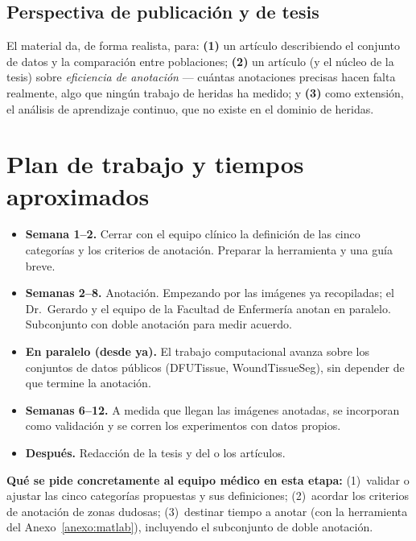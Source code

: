 \documentclass[12pt,letterpaper]{article}
\begin{document}
\subsection{Perspectiva de publicación y de tesis}

El material da, de forma realista, para: \textbf{(1)} un artículo describiendo el conjunto de datos y
la comparación entre poblaciones; \textbf{(2)} un artículo (y el núcleo de la tesis) sobre
\emph{eficiencia de anotación} --- cuántas anotaciones precisas hacen falta realmente, algo que
ningún trabajo de heridas ha medido; y \textbf{(3)} como extensión, el análisis de aprendizaje
continuo, que no existe en el dominio de heridas.

\section{Plan de trabajo y tiempos aproximados}

\begin{itemize}
  \item \textbf{Semana 1--2.} Cerrar con el equipo clínico la definición de las cinco categorías y
        los criterios de anotación. Preparar la herramienta y una guía breve.
  \item \textbf{Semanas 2--8.} Anotación. Empezando por las imágenes ya recopiladas; el Dr.\ Gerardo
        y el equipo de la Facultad de Enfermería anotan en paralelo. Subconjunto con doble anotación
        para medir acuerdo.
  \item \textbf{En paralelo (desde ya).} El trabajo computacional avanza sobre los conjuntos de
        datos públicos (DFUTissue, WoundTissueSeg), sin depender de que termine la anotación.
  \item \textbf{Semanas 6--12.} A medida que llegan las imágenes anotadas, se incorporan como
        validación y se corren los experimentos con datos propios.
  \item \textbf{Después.} Redacción de la tesis y del o los artículos.
\end{itemize}

\vspace{0.5em}
\noindent\textbf{Qué se pide concretamente al equipo médico en esta etapa:}
(1)~validar o ajustar las cinco categorías propuestas y sus definiciones;
(2)~acordar los criterios de anotación de zonas dudosas;
(3)~destinar tiempo a anotar (con la herramienta del Anexo~\ref{anexo:matlab}), incluyendo el
subconjunto de doble anotación.
\end{document}
